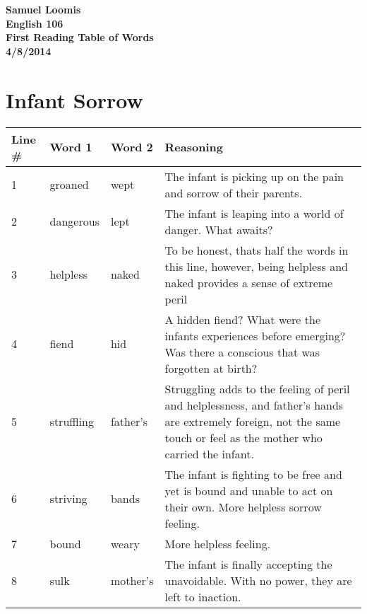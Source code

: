 \documentclass[a4paper,12pt]{article}
\begin{document}
\begin{center}
\bf{\huge Samuel Loomis}\\
\bf{\large English 106}\\
\bf{\large First Reading Table of Words}\\
\bf{\large 4/8/2014}
\end{center}
\newpage
\section*{Infant Sorrow}
\begin{center}
	\begin{tabular}{|l|l|l|p{2.5in}|}
	\hline
	Line \#& Word 1 & Word 2 & Reasoning \\ \hline
	1&groaned&wept&The infant is picking up on the pain and sorrow of their parents.\\ \hline
	2&dangerous&lept&The infant is leaping into a world of danger.  What awaits?\\ \hline
	3&helpless&naked&To be honest, thats half the words in this line, however, being helpless and naked provides a sense of extreme peril\\ \hline
	4&fiend&hid&A hidden fiend?  What were the infants experiences before emerging?  Was there a conscious that was forgotten at birth?\\ \hline
	5&struffling&father's&Struggling adds to the feeling of peril and helplessness, and father's hands are extremely foreign, not the same touch or feel as the mother who carried the infant.\\ \hline
	6&striving&bands&The infant is fighting to be free and yet is bound and unable to act on their own.  More helpless sorrow feeling.\\ \hline
	7&bound&weary&More helpless feeling.\\ \hline
	8&sulk&mother's&The infant is finally accepting the unavoidable.  With no power, they are left to inaction.\\ \hline
	\end{tabular}
\end{center} 
\end{document}
